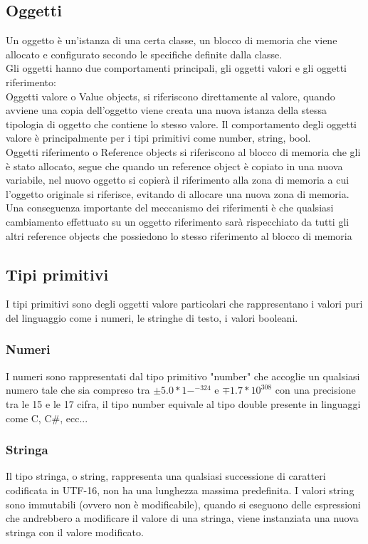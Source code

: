  
\subsection{Oggetti}
Un oggetto è un'istanza di una certa classe, un blocco di memoria che viene allocato e configurato secondo
le specifiche definite dalla classe. \\
Gli oggetti hanno due comportamenti principali, gli oggetti valori e gli oggetti riferimento:
\\
Oggetti valore o Value objects, si riferiscono direttamente al valore, quando avviene una copia dell'oggetto
viene creata una nuova istanza della stessa tipologia di oggetto che contiene lo stesso valore.
Il comportamento degli oggetti valore è principalmente per i tipi primitivi come number, string, bool.
\\
Oggetti riferimento o Reference objects si riferiscono al blocco di memoria che gli è stato allocato,
segue che quando un reference object è copiato in una nuova variabile, nel nuovo oggetto si copierà 
il riferimento alla zona di memoria a cui l'oggetto originale si riferisce, evitando di allocare una
nuova zona di memoria. 
\\
Una conseguenza importante del meccanismo dei riferimenti è che qualsiasi cambiamento effettuato su un
oggetto riferimento sarà rispecchiato da tutti gli altri reference objects che possiedono lo stesso riferimento
al blocco di memoria

\newpage
\subsection{Tipi primitivi}
I tipi primitivi sono degli oggetti valore particolari che rappresentano i valori puri del linguaggio come
i numeri, le stringhe di testo, i valori booleani.

\subsubsection{Numeri}
I numeri sono rappresentati dal tipo primitivo "number" che accoglie un qualsiasi numero tale che
sia compreso tra \( \pm5.0*1-^{-324} \) e \(\mp 1.7*10^308\) con una precisione tra le 15 e le 17
cifra, il tipo number equivale al tipo double presente in linguaggi come C, C\#, ecc...

\subsubsection{Stringa}
Il tipo stringa, o string, rappresenta una qualsiasi successione di caratteri codificata in UTF-16, 
non ha una lunghezza massima predefinita.
I valori string sono immutabili (ovvero non è modificabile), quando si eseguono delle espressioni
che andrebbero a modificare il valore di una stringa, viene instanziata una nuova stringa con il valore
modificato.

